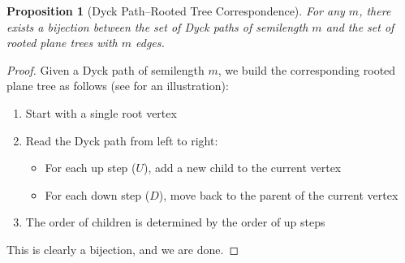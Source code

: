 \documentclass[letterpaper,11pt,oneside,reqno]{book}
\numberwithin{equation}{chapter}  %
\newtheorem{proposition}{Proposition}[chapter]  %
\theoremstyle{definition}
\begin{document}
\begin{proposition}[Dyck Path--Rooted Tree Correspondence]
	\label{lecture2:prop:dyck-tree}
For any $m$, there exists a bijection between
the set of Dyck paths of semilength $m$ and the set of rooted plane trees with $m$ edges.
\end{proposition}

\begin{proof}
Given a Dyck path of semilength $m$, we build the corresponding rooted plane tree as follows
(see  for an illustration):
\begin{enumerate}
    \item Start with a single root vertex
    \item Read the Dyck path from left to right:
        \begin{itemize}
            \item For each up step ($U$), add a new child to the current vertex
            \item For each down step ($D$), move back to the parent of the current vertex
        \end{itemize}
    \item The order of children is determined by the order of up steps
\end{enumerate}
This is clearly a bijection, and we are done.
\end{proof}
\end{document}
